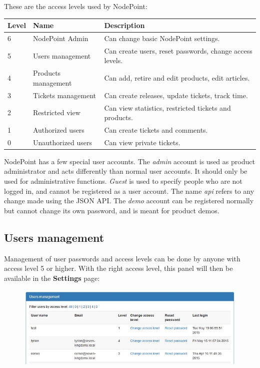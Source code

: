 \documentclass[11pt]{article}
\begin{document}
These are the access levels used by NodePoint:

\def\arraystretch{1.3} 
\begin{tabular}{ |p{15mm}|p{50mm}|p{100mm}| } 
\hline
\textbf{Level} & \textbf{Name} & \textbf{Description}\\
\hline
6 & NodePoint Admin & Can change basic NodePoint settings.\\
5 & Users management & Can create users, reset passwords, change access levels.\\
4 & Products management & Can add, retire and edit products, edit articles.\\
3 & Tickets management & Can create releases, update tickets, track time.\\
2 & Restricted view & Can view statistics, restricted tickets and products.\\
1 & Authorized users & Can create tickets and comments.\\
0 & Unauthorized users & Can view private tickets.\\
\hline
\end{tabular}

NodePoint has a few special user accounts. The \textit{admin} account is used as product administrator and acts differently than normal user accounts. It should only be used for administrative functions. \textit{Guest} is used to specify people who are not logged in, and cannot be registered as a user account. The name \textit{api} refers to any change made using the JSON API. The \textit{demo} account can be registered normally but cannot change its own password, and is meant for product demos.

\subsection{Users management}
Management of user passwords and access levels can be done by anyone with access level 5 or higher. With the right access level, this panel will then be available in the \textbf{Settings} page:

\begin{figure}[h]
\includegraphics{userman.jpg}
\end{figure}
\end{document}
